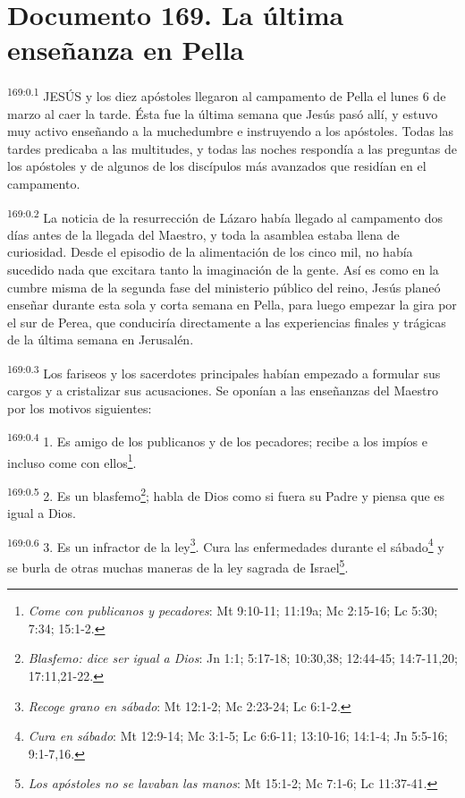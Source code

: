 \chapter{Documento 169. La última enseñanza en Pella}
\par 
\textsuperscript{169:0.1} JESÚS y los diez apóstoles llegaron al campamento de Pella el lunes 6 de marzo al caer la tarde. Ésta fue la última semana que Jesús pasó allí, y estuvo muy activo enseñando a la muchedumbre e instruyendo a los apóstoles. Todas las tardes predicaba a las multitudes, y todas las noches respondía a las preguntas de los apóstoles y de algunos de los discípulos más avanzados que residían en el campamento.

\par 
\textsuperscript{169:0.2} La noticia de la resurrección de Lázaro había llegado al campamento dos días antes de la llegada del Maestro, y toda la asamblea estaba llena de curiosidad. Desde el episodio de la alimentación de los cinco mil, no había sucedido nada que excitara tanto la imaginación de la gente. Así es como en la cumbre misma de la segunda fase del ministerio público del reino, Jesús planeó enseñar durante esta sola y corta semana en Pella, para luego empezar la gira por el sur de Perea, que conduciría directamente a las experiencias finales y trágicas de la última semana en Jerusalén.

\par 
\textsuperscript{169:0.3} Los fariseos y los sacerdotes principales habían empezado a formular sus cargos y a cristalizar sus acusaciones. Se oponían a las enseñanzas del Maestro por los motivos siguientes:

\par 
\textsuperscript{169:0.4} 1. Es amigo de los publicanos y de los pecadores; recibe a los impíos e incluso come con ellos\footnote{\textit{Come con publicanos y pecadores}: Mt 9:10-11; 11:19a; Mc 2:15-16; Lc 5:30; 7:34; 15:1-2.}.

\par 
\textsuperscript{169:0.5} 2. Es un blasfemo\footnote{\textit{Blasfemo: dice ser igual a Dios}: Jn 1:1; 5:17-18; 10:30,38; 12:44-45; 14:7-11,20; 17:11,21-22.}; habla de Dios como si fuera su Padre y piensa que es igual a Dios.

\par 
\textsuperscript{169:0.6} 3. Es un infractor de la ley\footnote{\textit{Recoge grano en sábado}: Mt 12:1-2; Mc 2:23-24; Lc 6:1-2.}. Cura las enfermedades durante el sábado\footnote{\textit{Cura en sábado}: Mt 12:9-14; Mc 3:1-5; Lc 6:6-11; 13:10-16; 14:1-4; Jn 5:5-16; 9:1-7,16.} y se burla de otras muchas maneras de la ley sagrada de Israel\footnote{\textit{Los apóstoles no se lavaban las manos}: Mt 15:1-2; Mc 7:1-6; Lc 11:37-41.}.

